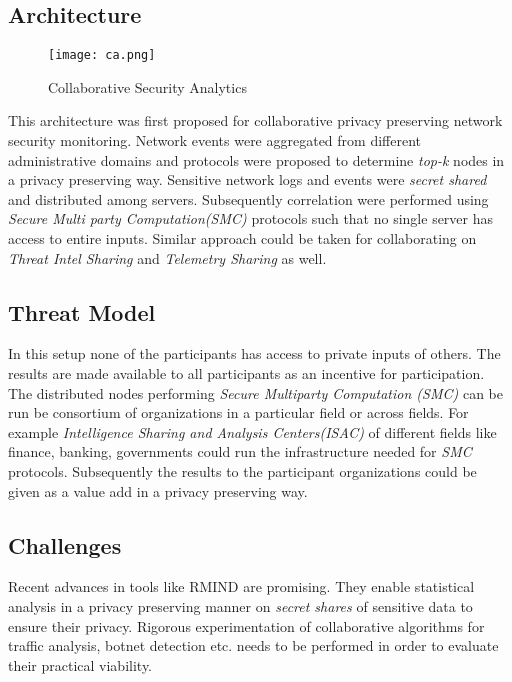 \documentclass[runningheads,a4paper]{llncs}
\begin{document}
\subsection{Architecture}
 \begin{figure} 
  \begin{center}
    \texttt{[image: ca.png]}
  \end{center}
  \caption{Collaborative Security Analytics}
  \label{fig:ca}
\end{figure}
This architecture was first proposed for collaborative privacy preserving network security monitoring\cite{burkhart2010sepia}. Network events were aggregated from different administrative domains and protocols were proposed to determine \emph{top-k} nodes in a privacy preserving way. Sensitive network logs and events were \emph{secret shared} and distributed among servers. Subsequently correlation were performed using \emph{Secure Multi party Computation(SMC)} protocols such that no single server has access to entire inputs. Similar approach could be taken for collaborating on \emph{Threat Intel Sharing} and \emph{Telemetry Sharing} as well. 

\subsection{Threat Model}
In this setup none of the participants has access to private inputs of others. The results are made available to all participants as an incentive for participation. The distributed nodes performing \emph{Secure Multiparty Computation (SMC)} can be run be consortium of organizations in a particular field or across fields. For example \emph{Intelligence Sharing and Analysis Centers(ISAC)} of different fields like finance, banking, governments could run the infrastructure needed for \emph{SMC} protocols. Subsequently  the results to the participant organizations could be given as a value add in a privacy preserving way.
\subsection{Challenges}
Recent advances in tools like RMIND\cite{bogdanov2014rmind} are promising. They enable statistical analysis in a privacy preserving manner on \emph{secret shares} of sensitive data to ensure their privacy.  Rigorous experimentation of collaborative algorithms for traffic analysis, botnet detection etc. needs to be performed in order to evaluate their practical viability. 
\end{document}
